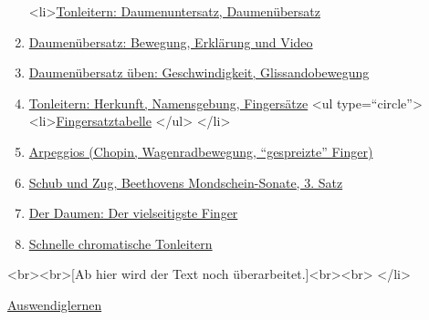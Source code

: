   \begin{enumerate}[label={\alph*.}] 
   <li>\hyperref[c1iii5a]{Tonleitern: Daumenuntersatz, Daumenübersatz}
   \item \hyperref[c1iii5b]{Daumenübersatz: Bewegung, Erklärung und Video}
   \item \hyperref[c1iii5c]{Daumenübersatz üben: Geschwindigkeit, Glissandobewegung}
   \item \hyperref[c1iii5d]{Tonleitern: Herkunft, Namensgebung, Fingersätze}
    <ul type=\enquote{circle}>
     <li>\hyperref[table]{Fingersatztabelle}
    </ul>
   </li>
   \item \hyperref[c1iii5e]{Arpeggios (Chopin, Wagenradbewegung, \enquote{gespreizte} Finger)}
   \item \hyperref[c1iii5f]{Schub und Zug, Beethovens Mondschein-Sonate, 3. Satz}
   \item \hyperref[c1iii5g]{Der Daumen: Der vielseitigste Finger}
   \item \hyperref[c1iii5h]{Schnelle chromatische Tonleitern}
   \end{enumerate}<br><br>[Ab hier wird der Text noch überarbeitet.]<br><br>
 </li>
 \item \hyperref[c1iii6]{Auswendiglernen}
